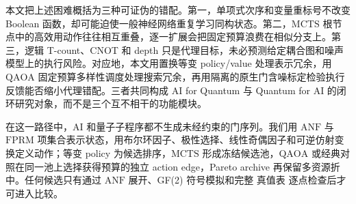 \documentclass[UTF8,fontset=fandol,11pt]{ctexart}
\newcommand{\anf}{\ensuremath{\mathrm{ANF}}}
\newcommand{\fprm}{\ensuremath{\mathrm{FPRM}}}
\newcommand{\mcts}{\ensuremath{\mathrm{MCTS}}}
\newcommand{\qaoa}{\ensuremath{\mathrm{QAOA}}}
\newcommand{\ttable}{真值表}
\begin{document}
本文把上述困难概括为三种可证伪的错配。第一，单项式次序和变量重标号不改变 Boolean 函数，却可能迫使一般神经网络重复学习同构状态。第二，\mcts{} 根节点中的高效用动作往往相互重叠，逐一扩展会把固定预算浪费在相似分支上。第三，逻辑 T-count、CNOT 和 depth 只是代理目标，未必预测给定耦合图和噪声模型上的执行风险。对应地，本文用置换等变 policy/value 处理表示冗余，用 \qaoa{} 固定预算多样性调度处理搜索冗余，再用隔离的原生门含噪标定检验执行反馈能否缩小代理错配。三者共同构成 AI for Quantum 与 Quantum for AI 的闭环研究对象，而不是三个互不相干的功能模块。

在这一路径中，AI 和量子子程序都不生成未经约束的门序列。我们用 \anf{} 与 \fprm{} 项集合表示状态，用布尔环因子、极性选择、线性奇偶因子和可逆仿射变换定义动作；等变 policy 为候选排序，\mcts{} 形成冻结候选池，\qaoa{} 或经典对照在同一池上选择获得预算的独立 action edge，Pareto archive 再保留多资源折中。任何候选只有通过 \anf{} 展开、GF(2) 符号模拟和完整 \ttable{} 逐点检查后才可进入比较。
\end{document}
